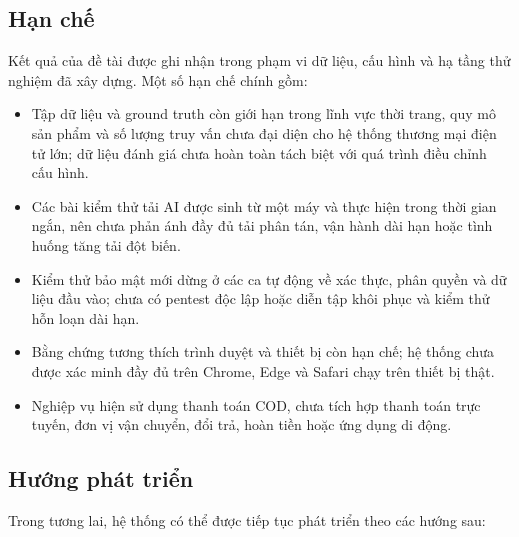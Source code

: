 \subsection{Hạn chế}

Kết quả của đề tài được ghi nhận trong phạm vi dữ liệu, cấu hình và hạ tầng thử nghiệm đã xây dựng. Một số hạn chế chính gồm:

\begin{itemize}[nosep]
    \item Tập dữ liệu và ground truth còn giới hạn trong lĩnh vực thời trang, quy mô sản phẩm và số lượng truy vấn chưa đại diện cho hệ thống thương mại điện tử lớn; dữ liệu đánh giá chưa hoàn toàn tách biệt với quá trình điều chỉnh cấu hình.
    \item Các bài kiểm thử tải AI được sinh từ một máy và thực hiện trong thời gian ngắn, nên chưa phản ánh đầy đủ tải phân tán, vận hành dài hạn hoặc tình huống tăng tải đột biến.
    \item Kiểm thử bảo mật mới dừng ở các ca tự động về xác thực, phân quyền và dữ liệu đầu vào; chưa có pentest độc lập hoặc diễn tập khôi phục và kiểm thử hỗn loạn dài hạn.
    \item Bằng chứng tương thích trình duyệt và thiết bị còn hạn chế; hệ thống chưa được xác minh đầy đủ trên Chrome, Edge và Safari chạy trên thiết bị thật.
    \item Nghiệp vụ hiện sử dụng thanh toán COD, chưa tích hợp thanh toán trực tuyến, đơn vị vận chuyển, đổi trả, hoàn tiền hoặc ứng dụng di động.
\end{itemize}

\subsection{Hướng phát triển}

Trong tương lai, hệ thống có thể được tiếp tục phát triển theo các hướng sau:

